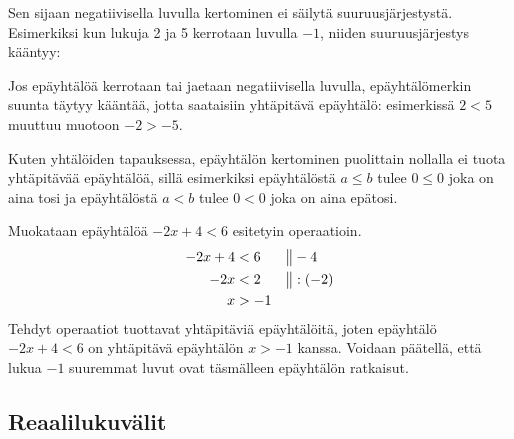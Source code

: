 Sen sijaan negatiivisella luvulla kertominen ei säilytä suuruusjärjestystä. Esimerkiksi kun lukuja 2 ja 5 kerrotaan luvulla $-1$, niiden suuruusjärjestys kääntyy:

\begin{lukusuora}{-6}{6}{12}

\lukusuorauusi
\end{lukusuora}

Jos epäyhtälöä kerrotaan tai jaetaan negatiivisella luvulla, epäyhtälömerkin suunta täytyy kääntää, jotta saataisiin yhtäpitävä epäyhtälö: esimerkissä $2 < 5$ muuttuu muotoon $-2 > -5$.


Kuten yhtälöiden tapauksessa, epäyhtälön kertominen puolittain nollalla ei tuota yhtäpitävää epäyhtälöä, sillä esimerkiksi epäyhtälöstä $a \leq b$ tulee $0 \leq 0$ joka on aina tosi ja epäyhtälöstä $a < b$ tulee $0 < 0$ joka on aina epätosi.

\begin{esimerkki}
Muokataan epäyhtälöä $-2x+4<6$ esitetyin operaatioin.
\begin{align*}
-2x+4&<6 &&\big\|-4 \\
-2x&<2 &&\big\|:(-2) \\
x&>-1
\end{align*}
Tehdyt operaatiot tuottavat yhtäpitäviä epäyhtälöitä, joten epäyhtälö $-2x+4<6$ on yhtäpitävä epäyhtälön $x>-1$ kanssa. Voidaan päätellä, että lukua $-1$ suuremmat luvut ovat täsmälleen epäyhtälön ratkaisut.
\end{esimerkki}

\subsection*{Reaalilukuvälit}

